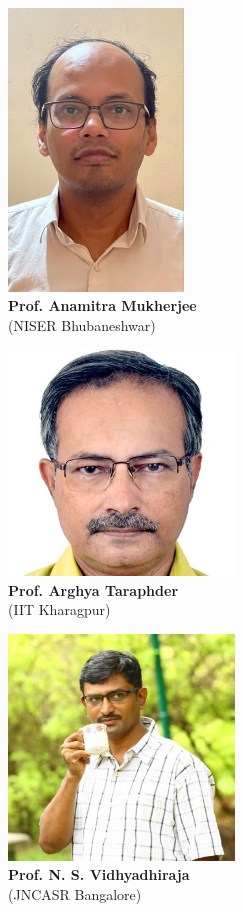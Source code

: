 \documentclass[10pt,aspectratio=169]{beamer}
\begin{document}
\begin{frame}{}
\hspace*{\fill}
\begin{minipage}{0.3\textwidth}
	\centering
	\includegraphics[width=0.35\textwidth]{anamitra.jpg}\\
	\footnotesize{{\bf Prof. Anamitra Mukherjee}\\
	(NISER Bhubaneshwar)}
\end{minipage}
\hspace*{\fill}
\begin{minipage}{0.3\textwidth}
	\centering
	\includegraphics[width=0.45\textwidth]{arghya.jpg}\\
	\footnotesize{{\bf Prof. Arghya Taraphder}\\
	(IIT Kharagpur)}
\end{minipage}
\hspace*{\fill}
\begin{minipage}{0.3\textwidth}
	\centering
	\includegraphics[width=0.45\textwidth]{nsv.jpeg}\\
	\footnotesize{{\bf Prof. N. S. Vidhyadhiraja}\\
	(JNCASR Bangalore)}
\end{minipage}
\hspace*{\fill}
\end{frame}
\end{document}

